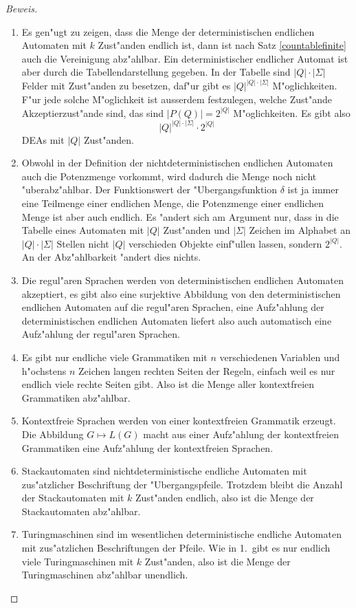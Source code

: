 \begin{proof}[Beweis]
\begin{enumerate}
\item Es gen"ugt zu zeigen, dass die Menge der deterministischen
endlichen Automaten mit $k$ Zust"anden endlich ist, dann ist nach
Satz \ref{countablefinite} auch die Vereinigung abz"ahlbar. Ein
deterministischer endlicher Automat ist aber durch die Tabellendarstellung
gegeben. In der Tabelle sind $|Q|\cdot|\Sigma|$ Felder mit Zust"anden
zu besetzen, daf"ur gibt es $|Q|^{|Q|\cdot|\Sigma|}$ M"oglichkeiten.
F"ur jede solche M"oglichkeit ist ausserdem festzulegen, welche Zust"ande
Akzeptierzust"ande sind, das sind $|P(Q)|=2^{|Q|}$ M"oglichkeiten. Es gibt
also
\[
|Q|^{|Q|\cdot|\Sigma|}\cdot 2^{|Q|}
\]
DEAs mit $|Q|$ Zust"anden.
\item Obwohl in der Definition der nichtdeterministischen endlichen
Automaten auch die Potenzmenge vorkommt, wird dadurch die Menge
noch nicht "uber\-abz"ahlbar. Der Funktionswert der "Ubergangsfunktion
$\delta$ ist ja immer eine Teilmenge einer endlichen Menge, die Potenzmenge
einer endlichen Menge ist aber auch endlich. Es "andert sich am Argument
nur, dass in die Tabelle eines Automaten mit $|Q|$ Zust"anden und
$|\Sigma|$ Zeichen im Alphabet an $|Q|\cdot|\Sigma|$ Stellen
nicht $|Q|$ verschieden Objekte einf"ullen lassen, sondern $2^{|Q|}$.
An der Abz"ahlbarkeit "andert dies nichts.
\item Die regul"aren Sprachen werden von deterministischen endlichen
Automaten akzeptiert, es gibt also eine surjektive Abbildung von
den deterministischen endlichen Automaten auf die regul"aren Sprachen,
eine Aufz"ahlung der deterministischen endlichen Automaten liefert also
auch automatisch eine Aufz"ahlung der regul"aren Sprachen.
\item Es gibt nur endliche viele Grammatiken mit $n$ verschiedenen
Variablen und h"ochstens $n$ Zeichen langen rechten Seiten der Regeln,
einfach weil es nur endlich viele rechte Seiten gibt. Also ist die
Menge aller kontextfreien Grammatiken abz"ahlbar.
\item Kontextfreie Sprachen werden von einer kontextfreien Grammatik
erzeugt. Die Abbildung $G\mapsto L(G)$ macht aus einer Aufz"ahlung
der kontextfreien Grammatiken eine Aufz"ahlung der kontextfreien Sprachen.
\item Stackautomaten sind nichtdeterministische endliche Automaten mit
zus"atzlicher Beschriftung der "Ubergangspfeile. Trotzdem bleibt die
Anzahl der Stackautomaten mit $k$ Zust"anden endlich, also ist die
Menge der Stackautomaten abz"ahlbar.
\item Turingmaschinen sind im wesentlichen deterministische endliche Automaten
mit zus"atzlichen Beschriftungen der Pfeile. Wie in 1.~gibt es nur endlich
viele Turingmaschinen mit $k$ Zust"anden, also ist die Menge der Turingmaschinen
abz"ahlbar unendlich.
\end{enumerate}
\end{proof}

